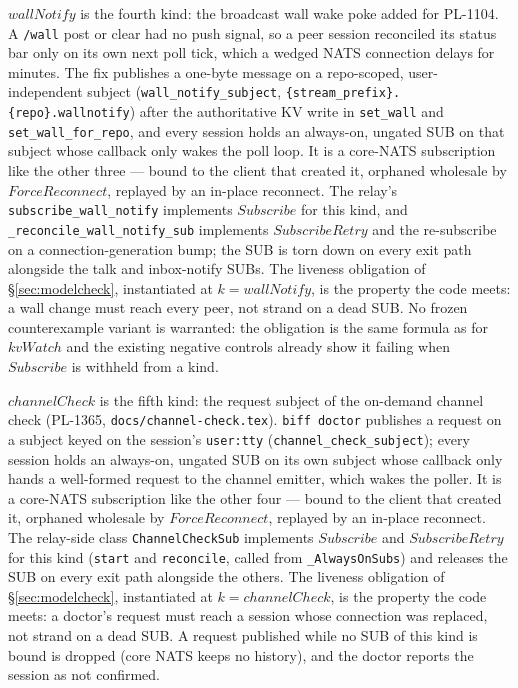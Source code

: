 \documentclass[a4paper,10pt,fleqn]{article}
\begin{document}
$wallNotify$ is the fourth kind: the broadcast wall wake poke added for
PL-1104.  A \texttt{/wall} post or clear had no push signal, so a peer
session reconciled its status bar only on its own next poll tick, which a
wedged NATS connection delays for minutes.  The fix publishes a one-byte
message on a repo-scoped, user-independent subject
(\texttt{wall\_notify\_subject}, \texttt{\{stream\_prefix\}.\{repo\}.wallnotify})
after the authoritative KV write in \texttt{set\_wall} and
\texttt{set\_wall\_for\_repo}, and every session holds an always-on,
ungated SUB on that subject whose callback only wakes the poll loop.  It is
a core-NATS subscription like the other three --- bound to the client that
created it, orphaned wholesale by $ForceReconnect$, replayed by an in-place
reconnect.  The relay's \texttt{subscribe\_wall\_notify} implements
$Subscribe$ for this kind, and \texttt{\_reconcile\_wall\_notify\_sub}
implements $SubscribeRetry$ and the re-subscribe on a
connection-generation bump; the SUB is torn down on every exit path
alongside the talk and inbox-notify SUBs.  The liveness obligation of
\S\ref{sec:modelcheck}, instantiated at $k = wallNotify$, is the property
the code meets: a wall change must reach every peer, not strand on a dead
SUB.  No frozen counterexample variant is warranted: the obligation is
the same formula as for $kvWatch$ and the existing negative controls
already show it failing when $Subscribe$ is withheld from a kind.

$channelCheck$ is the fifth kind: the request subject of the on-demand
channel check (PL-1365, \texttt{docs/channel-check.tex}).  \texttt{biff doctor}
publishes a request on a subject keyed on the session's \texttt{user:tty}
(\texttt{channel\_check\_subject}); every session holds an always-on, ungated
SUB on its own subject whose callback only hands a well-formed request to the
channel emitter, which wakes the poller.  It is a core-NATS subscription like
the other four --- bound to the client that created it, orphaned wholesale by
$ForceReconnect$, replayed by an in-place reconnect.  The relay-side class
\texttt{ChannelCheckSub} implements $Subscribe$ and $SubscribeRetry$ for this
kind (\texttt{start} and \texttt{reconcile}, called from
\texttt{\_AlwaysOnSubs}) and releases the SUB on every exit path alongside
the others.  The liveness obligation of \S\ref{sec:modelcheck}, instantiated
at $k = channelCheck$, is the property the code meets: a doctor's request must
reach a session whose connection was replaced, not strand on a dead SUB.  A
request published while no SUB of this kind is bound is dropped (core NATS keeps
no history), and the doctor reports the session as not confirmed.
\end{document}
